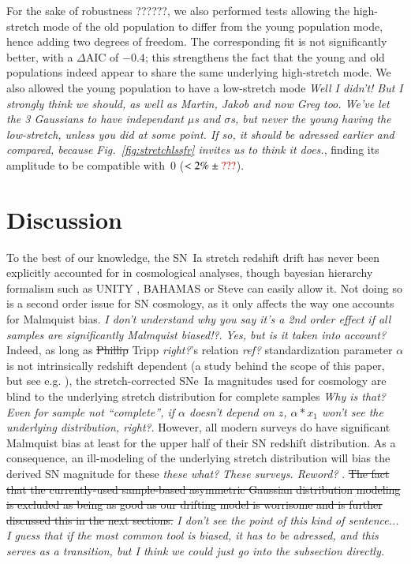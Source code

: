 \documentclass[]{aa} %
\newcommand{\nn}[1]{{\textcolor[rgb]{0.25, 0.50, 0}{#1}}}
\newcommand{\yc}[1]{{\textcolor{BrickRed}{#1}}}
\begin{document}
For the sake of robustness \yc{???}\nn{???}, we also performed tests allowing
the high-stretch mode of the old population to differ from the young population
mode, hence adding two degrees of freedom. The corresponding fit is not
significantly better, with a $\Delta$AIC of $-0.4$; this strengthens the fact
that the young and old populations indeed appear to share the same underlying
high-stretch mode. We also allowed the young population to have a low-stretch
mode \nn{\textit{Well I didn't! But I strongly think we should, as well as
Martin, Jakob and now Greg too. We've let the 3 Gaussians to have
independant $\mu$s and $\sigma$s, but never the young having the low-stretch,
unless you did at some point. If so, it should be adressed earlier and compared,
because Fig.~\ref{fig:stretchlssfr} invites us to think it does.}}, finding its
amplitude to be compatible with~0 ($<2\% \pm \yc{???}$).

\section{Discussion}\label{sec:discussion}

To the best of our knowledge, the SN~Ia stretch redshift drift has never been
explicitly accounted for in cosmological analyses, though bayesian hierarchy
formalism such as UNITY \citep{rubin2015}, BAHAMAS \citep{shariff2016} or Steve
\citep{hinton2019} can easily allow it. Not doing so is a second order issue for
SN cosmology, as it only affects the way one accounts for Malmquist bias.
\yc{\textit{I don't understand why you say it's a 2nd order effect if all
samples are significantly Malmquist biased!?}}. \nn{\textit{Yes, but is
it taken into account?}} Indeed, as long as \nn{\sout{Phillip} Tripp
\textit{right?}}'s relation \yc{\textit{ref?}} standardization parameter
$\alpha$ is not intrinsically redshift dependent (a study behind the scope of
this paper, but see e.g. \citealt{scolnic2018a}), the stretch-corrected SNe~Ia
magnitudes used for cosmology are blind to the underlying stretch distribution
\yc{for complete samples} \nn{\textit{Why is that? Even for sample not
``complete'', if $\alpha$ doesn't depend on $z$, $\alpha*x_1$ won't see the
underlying distribution, right?}}. However, all modern surveys do have
significant Malmquist bias at least for the upper half of their SN redshift
distribution. As a consequence, an ill-modeling of the underlying stretch
distribution will bias the derived SN magnitude for these \yc{\textit{these
what?}} \nn{\textit{These surveys. Reword?}} \citep[see e.g.,][]{rubin2015,
rubin2016}. \sout{The fact that the currently-used sample-based asymmetric Gaussian
distribution modeling is excluded \nn{as being as good as our drifting model is
worrisome and is further discussed} this in the next sections.} \yc{\textit{I
don't see the point of this kind of sentence...}} \nn{\textit{I guess that if
the most common tool is biased, it has to be adressed, and this serves as a
transition, but I think we could just go into the subsection directly.}}
\end{document}

